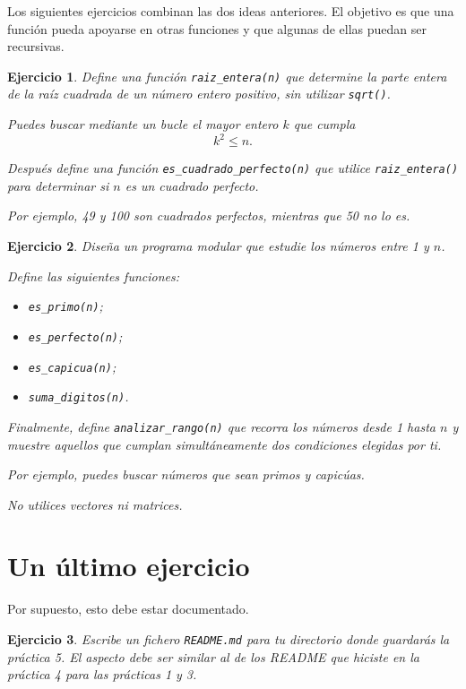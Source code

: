\documentclass[11pt,a4paper]{article}
\theoremstyle{exercise}
\newtheorem{exercise}{Ejercicio}
\begin{document}
Los siguientes ejercicios combinan las dos ideas anteriores. El objetivo es que una función pueda apoyarse en otras funciones y que algunas de ellas puedan ser recursivas.


\begin{exercise} Define una función \texttt{raiz\_entera(n)} que determine la parte entera de la raíz cuadrada de un número entero positivo, sin utilizar \texttt{sqrt()}.

Puedes buscar mediante un bucle el mayor entero $k$ que cumpla \[ k^2\leq n. \]

Después define una función \texttt{es\_cuadrado\_perfecto(n)} que utilice \texttt{raiz\_entera()} para determinar si $n$ es un cuadrado perfecto.

Por ejemplo, 49 y 100 son cuadrados perfectos, mientras que 50 no lo es. 
\end{exercise}

\begin{exercise} Diseña un programa modular que estudie los números entre 1 y $n$.

Define las siguientes funciones:

\begin{itemize}
	\item \texttt{es\_primo(n)};
	\item \texttt{es\_perfecto(n)};
	\item \texttt{es\_capicua(n)};
	\item \texttt{suma\_digitos(n)}.
\end{itemize}

Finalmente, define \texttt{analizar\_rango(n)} que recorra los números desde 1 hasta $n$ y muestre aquellos que cumplan simultáneamente dos condiciones elegidas por ti.

Por ejemplo, puedes buscar números que sean primos y capicúas.

No utilices vectores ni matrices.
\end{exercise}

\fi



\section{Un último ejercicio}


Por supuesto, esto debe estar documentado.

\begin{exercise} Escribe un fichero \texttt{README.md} para tu directorio donde guardarás la práctica 5. El aspecto debe ser similar al de los README que hiciste en la práctica 4 para las prácticas 1 y 3. 
\end{exercise}
\end{document}
